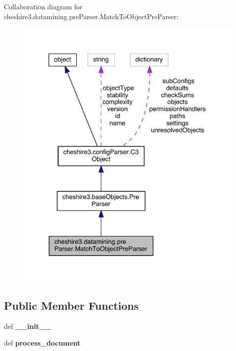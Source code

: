 Collaboration diagram for cheshire3.\-datamining.\-pre\-Parser.\-Match\-To\-Object\-Pre\-Parser\-:
\nopagebreak
\begin{figure}[H]
\begin{center}
\leavevmode
\includegraphics[width=325pt]{classcheshire3_1_1datamining_1_1pre_parser_1_1_match_to_object_pre_parser__coll__graph}
\end{center}
\end{figure}
\subsection*{Public Member Functions}
\begin{DoxyCompactItemize}
\item 
\hypertarget{classcheshire3_1_1datamining_1_1pre_parser_1_1_match_to_object_pre_parser_a6a6e7859210fea738511fe71d1a8fd36}{def {\bfseries \-\_\-\-\_\-init\-\_\-\-\_\-}}\label{classcheshire3_1_1datamining_1_1pre_parser_1_1_match_to_object_pre_parser_a6a6e7859210fea738511fe71d1a8fd36}

\item 
\hypertarget{classcheshire3_1_1datamining_1_1pre_parser_1_1_match_to_object_pre_parser_a2094980c336c14202334ea1b9fddeab6}{def {\bfseries process\-\_\-document}}\label{classcheshire3_1_1datamining_1_1pre_parser_1_1_match_to_object_pre_parser_a2094980c336c14202334ea1b9fddeab6}

\end{DoxyCompactItemize}
